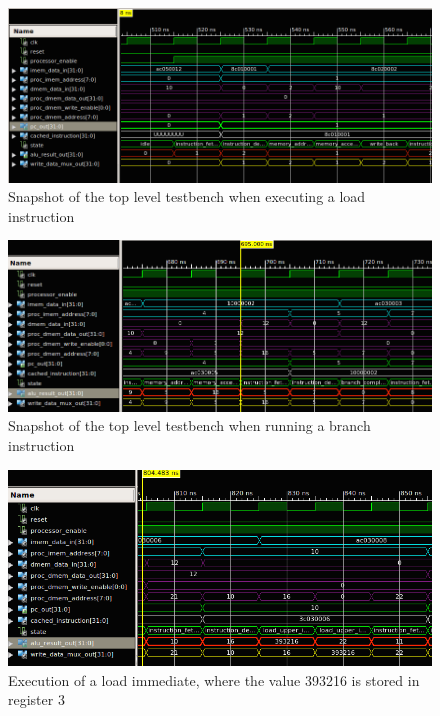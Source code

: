 \begin{figure}[ht!]
    \begin{center}
    \includegraphics[width=\textwidth]{assets/isim/memory_read_cycle.png}
    \caption{Snapshot of the top level testbench when executing a load instruction}
    \label{fig:memory_read_cycle}
    \end{center}
\end{figure}

\begin{figure}[ht!]
    \begin{center}
    \includegraphics[width=\textwidth]{assets/isim/branch_completion_cycle.png}
    \caption{Snapshot of the top level testbench when running a branch instruction}
    \label{fig:branch_completion_cycle}
    \end{center}
\end{figure}

\begin{figure}[ht!]
    \begin{center}
    \includegraphics[width=\textwidth]{assets/isim/load_upper_cycle.png}
    \caption{Execution of a load immediate, where the value 393216 is stored in register 3}
    \label{fig:load_upper_cycle}
    \end{center}
\end{figure}

